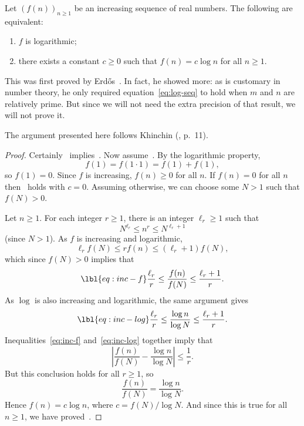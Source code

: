 \begin{thm}[Erd\H{o}s]
%
%
Let $(f(n))_{n \geq 1}$ be an increasing sequence of real numbers.  The
following are equivalent:
% 
\begin{enumerate}
\item 
{}
$f$ is logarithmic;

\item
{}
there exists a constant $c \geq 0$ such that $f(n) = c \log n$ for all $n
\geq 1$. 
\end{enumerate}
\end{thm}

This was first proved by Erd\H{o}s~\cite{ErdoDFA}.  In fact, he
showed more: as is customary in number theory, he only required
equation~\eqref{eq:log-seq} to hold when $m$ and $n$ are relatively prime.
But since we will not need the extra precision of that result, we will not
prove it.  

The argument presented here follows Khinchin (\cite{Khin}, p.~11).

\begin{proof}
Certainly~ implies~.
Now assume~.  By the logarithmic property,
\[
f(1) = f(1 \cdot 1) = f(1) + f(1),
\]
so $f(1) = 0$.  Since $f$ is increasing, $f(n) \geq 0$ for all $n$.  If
$f(n) = 0$ for all $n$ then~ holds with $c = 0$.
Assuming otherwise, we can choose some $N > 1$ such that $f(N) > 0$.

Let $n \geq 1$.  For each integer $r \geq 1$, there is an integer
$\ell_r \geq 1$ such that
\[
N^{\ell_r} \leq n^r \leq N^{\ell_r + 1}
\]
(since $N > 1$).  As $f$ is increasing and logarithmic, 
\[
\ell_r f(N) \leq r f(n) \leq (\ell_r + 1)f(N),
\]
which since $f(N) > 0$ implies that 
% 
\begin{equation}
\lbl{eq:inc-f}
\frac{\ell_r}{r} \leq \frac{f(n)}{f(N)} \leq \frac{\ell_r + 1}{r}.
\end{equation}
% 
As $\log$ is also increasing and logarithmic, the same argument gives
% 
\begin{equation}
\lbl{eq:inc-log}
\frac{\ell_r}{r} \leq \frac{\log n}{\log N} \leq \frac{\ell_r + 1}{r}.
\end{equation}
% 
Inequalities~\eqref{eq:inc-f} and~\eqref{eq:inc-log} together imply that
\[
\left| \frac{f(n)}{f(N)} - \frac{\log n}{\log N} \right| 
\leq
\frac{1}{r}.
\]
But this conclusion holds for all $r \geq 1$, so 
\[
\frac{f(n)}{f(N)} = \frac{\log n}{\log N}.
\]
Hence $f(n) = c \log n$, where $c = f(N)/\log N$.  And since this is true
for all $n \geq 1$, we have proved~.
\end{proof}

